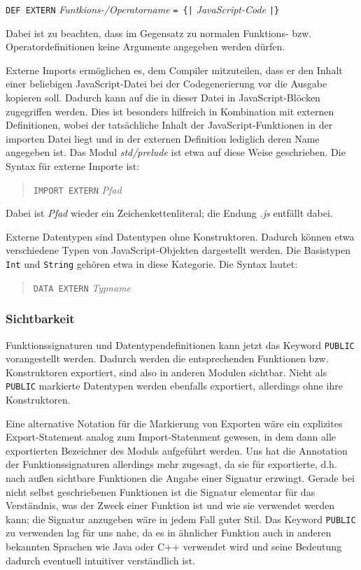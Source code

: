 \documentclass[runningheads]{llncs}
\begin{document}
\verb|DEF EXTERN| \emph{Funtkions-/Operatorname} \verb:= {|:
\emph{JavaScript-Code} \verb:|}:

Dabei ist zu beachten, dass im Gegensatz zu normalen Funktions-
bzw. Operatordefinitionen keine Argumente angegeben werden dürfen.

Externe Imports ermöglichen es, dem Compiler mitzuteilen, dass er den
Inhalt einer beliebigen JavaScript-Datei bei der
Codegenerierung vor die Ausgabe kopieren soll. Dadurch kann auf die
in dieser Datei in JavaScript-Blöcken zugegriffen werden.
Dies ist besonders hilfreich in Kombination mit externen Definitionen,
wobei der tatsächliche Inhalt der JavaScript-Funktionen in der
importen Datei liegt und in der externen Definition lediglich deren
Name angegeben ist.  Das Modul \emph{std/prelude} ist etwa auf diese
Weise geschrieben. Die Syntax für externe Importe ist:

\begin{quote}
\verb|IMPORT EXTERN| \emph{Pfad}
\end{quote}

Dabei ist \emph{Pfad} wieder ein Zeichenkettenliteral; die Endung
\emph{.js} entfällt dabei.

Externe Datentypen sind Datentypen ohne Konstruktoren. Dadurch können
etwa verschiedene Typen von JavaScript-Objekten dargestellt
werden.  Die Basistypen \verb|Int| und \verb|String| gehören etwa in
diese Kategorie.  Die Syntax lautet:

\begin{quote}
\verb|DATA EXTERN| \emph{Typname}
\end{quote}

\subsubsection{Sichtbarkeit}

Funktionssignaturen und Datentypendefinitionen kann jetzt das Keyword
\verb|PUBLIC| vorangestellt werden.  Dadurch werden die entsprechenden
Funktionen bzw. Konstruktoren exportiert, sind also in anderen Modulen
sichtbar.  Nicht als \verb|PUBLIC| markierte Datentypen werden
ebenfalls exportiert, allerdings ohne ihre Konstruktoren.

Eine alternative Notation für die Markierung von Exporten wäre ein
explizites Export-Statement analog zum Import-Statenment gewesen, in
dem dann alle exportierten Bezeichner des Moduls aufgeführt werden.
Uns hat die Annotation der Funktionssignaturen allerdings mehr
zugesagt, da sie für exportierte, d.h. nach außen sichtbare Funktionen
die Angabe einer Signatur erzwingt.  Gerade bei nicht selbst
geschriebenen Funktionen ist die Signatur elementar für das
Verständnis, was der Zweck einer Funktion ist und wie sie verwendet
werden kann; die Signatur anzugeben wäre in jedem Fall guter Stil.
Das Keyword \verb|PUBLIC| zu verwenden lag für uns nahe, da es in
ähnlicher Funktion auch in anderen bekannten Sprachen wie Java oder
C++ verwendet wird und seine Bedeutung dadurch eventuell intuitiver
verständlich ist.
\end{document}
